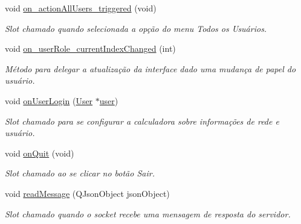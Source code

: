 \begin{DoxyCompactItemize}
void \hyperlink{classMyCalcWindow_ab50a651bb1983993008960ad39d93ed6}{on\+\_\+action\+All\+Users\+\_\+triggered} (void)
\begin{DoxyCompactList}\small\item\em Slot chamado quando selecionada a opção do menu \textquotesingle{}Todos os Usuários\textquotesingle{}. \end{DoxyCompactList}\item 
void \hyperlink{classMyCalcWindow_ae563c8fa18e6d1c3a7c2c1014a133e66}{on\+\_\+user\+Role\+\_\+current\+Index\+Changed} (int)
\begin{DoxyCompactList}\small\item\em Método para delegar a atualização da interface dado uma mudança de papel do usuário. \end{DoxyCompactList}\item 
void \hyperlink{classMyCalcWindow_aa04caeaafdba97eeb25d3dd92be4d545}{on\+User\+Login} (\hyperlink{classUser}{User} $\ast$\hyperlink{classMyCalcWindow_a730189195d0831ae9fee62f7c519e439}{user})
\begin{DoxyCompactList}\small\item\em Slot chamado para se configurar a calculadora sobre informações de rede e usuário. \end{DoxyCompactList}\item 
void \hyperlink{classMyCalcWindow_a809b1da213d1424ba098c1f0ee2d0bd5}{on\+Quit} (void)\hypertarget{classMyCalcWindow_a809b1da213d1424ba098c1f0ee2d0bd5}{}\label{classMyCalcWindow_a809b1da213d1424ba098c1f0ee2d0bd5}

\begin{DoxyCompactList}\small\item\em Slot chamado ao se clicar no botão \textquotesingle{}Sair\textquotesingle{}. \end{DoxyCompactList}\item 
void \hyperlink{classMyCalcWindow_aaa868eba4e3ee5a52d28c0c34bbbd8cd}{read\+Message} (Q\+Json\+Object json\+Object)
\begin{DoxyCompactList}\small\item\em Slot chamado quando o socket recebe uma mensagem de resposta do servidor. \end{DoxyCompactList}\end{DoxyCompactItemize}
